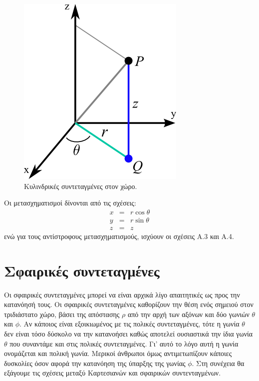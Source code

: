 \begin{figure}[h]
    \centering
    \includegraphics[scale=0.5]{Figures/appendixA_cylindrical_coordinates.png}
    \caption{Κυλινδρικές συντεταγμένες στον χώρο.}
    \label{fig:apxA_cylindrical_coordinates}
\end{figure}

Οι μετασχηματισμοί δίνονται από τις σχέσεις:
\begin{eqnarray}
    x &=& r \cos \theta \\
    y &=& r \sin \theta \\
    z &=& z
\end{eqnarray}
ενώ για τους αντίστροφους μετασχηματισμούς, ισχύουν οι σχέσεις Α.3 και Α.4.

\section{Σφαιρικές συντεταγμένες}
Οι σφαιρικές συντεταγμένες μπορεί να είναι αρχικά λίγο απαιτητικές ως προς την κατανόησή τους. Οι σφαιρικές συντεταγμένες καθορίζουν την θέση ενός σημειού στον τριδιάστατο χώρο, βάσει της απόστασης $\rho$ από την αρχή των αξόνων και δύο γωνιών $\theta$ και $\phi$. Αν κάποιος είναι εξοικιωμένος με τις πολικές συντεταγμένες, τότε η γωνία $\theta$ δεν είναι τόσο δύσκολο  να την κατανοήσει καθώς αποτελεί ουσιαστικά την ίδια γωνία $\theta$ που συναντάμε και στις πολικές συντεταγμένες. Γι' αυτό το λόγο αυτή η γωνία ονομάζεται και πολική γωνία. Μερικοί άνθρωποι όμως αντιμετωπίζουν κάποιες δυσκολίες όσον αφορά την κατανόηση της ύπαρξης της γωνίας $\phi$. Στη συνέχεια θα εξάγουμε τις σχέσεις μεταξύ Καρτεσιανών και σφαιρικών συντενταγμένων.

